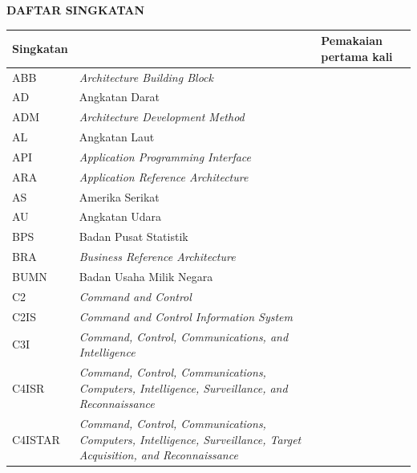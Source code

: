 \cleardoublepage
\vspace{2cm}
\begin{center}
{\fontsize{14}{16.8}\selectfont\textbf{DAFTAR SINGKATAN}}\\[1em]
\end{center}
\label{chap:singkatan}
\setcounter{chapter}{0}
\setcounter{section}{0}
\vspace{2em}

\begin{longtable}{@{} l >{\raggedright\arraybackslash}p{7.2cm} c @{}}
\multicolumn{1}{l}{\textbf{Singkatan}} & \multicolumn{1}{l}{\textbf{Deskripsi}} & \multicolumn{1}{l}{\parbox[c]{3.5cm}{\raggedright \textbf{Pemakaian pertama kali}}} \\[0.5em]
\endhead
ABB & \textit{Architecture Building Block} & \pageref{sk:ABB} \\
AD & Angkatan Darat & \pageref{sk:AD} \\
ADM & \textit{Architecture Development Method} & \pageref{sk:ADM} \\
AL & Angkatan Laut & \pageref{sk:AL} \\
API & \textit{Application Programming Interface} & \pageref{sk:API} \\
ARA & \textit{Application Reference Architecture} & \pageref{sk:ARA} \\
AS & Amerika Serikat & \pageref{sk:AS} \\
AU & Angkatan Udara & \pageref{sk:AU} \\
BPS & Badan Pusat Statistik & \pageref{sk:BPS} \\
BRA & \textit{Business Reference Architecture} & \pageref{sk:BRA} \\
BUMN & Badan Usaha Milik Negara & \pageref{sk:BUMN} \\
C2 & \textit{Command and Control} & \pageref{sk:C2} \\
C2IS & \textit{Command and Control Information System} & \pageref{sk:C2IS} \\
C3I & \textit{Command, Control, Communications, and Intelligence} & \pageref{sk:C3I} \\
C4ISR & \textit{Command, Control, Communications, Computers, Intelligence, Surveillance, and Reconnaissance} & \pageref{sk:C4ISR} \\
C4ISTAR & \textit{Command, Control, Communications, Computers, Intelligence, Surveillance, Target Acquisition, and Reconnaissance} & \pageref{sk:C4ISTAR} \\

\end{longtable}
